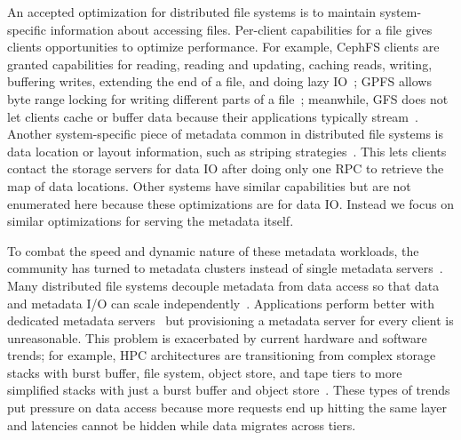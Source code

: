 An accepted optimization for distributed file systems is to maintain
system-specific information about accessing files.  Per-client capabilities for
a file gives clients opportunities to optimize performance.  For example,
CephFS clients are granted capabilities for reading, reading and updating,
caching reads, writing, buffering writes, extending the end of a file, and
doing lazy IO~\cite{docs:cephcaps}; GPFS allows byte range locking for writing
different parts of a file~\cite{schmuck:fast2002-gpfs}; meanwhile, GFS does not
let clients cache or buffer data because their applications typically
stream~\cite{ghemawat:sosp2003-gfs}. Another system-specific piece of metadata
common in distributed file systems is data location or layout information, such
as striping strategies~\cite{nagle_panasas_2004, welch:fast08-panasas,
wang:tech09-lustre, docs:cephstripe, sinnamohideen:atc2010-ursa,
ghemawat:sosp2003-gfs}. This lets clients contact the storage servers for data
IO after doing only one RPC to retrieve the map of data locations.  Other
systems have similar capabilities but are not enumerated here because these
optimizations are for data IO.  Instead we focus on similar optimizations for
serving the metadata itself.

To combat the speed and dynamic nature of these metadata workloads, the
community has turned to metadata clusters instead of single metadata
servers~\cite{patil:fast2011-giga+,weil:osdi2006-ceph,weil:sc2004-dyn-metadata,
sinnamohideen:atc2010-ursa, xing:sc2009-skyfs}.  Many distributed file systems
decouple metadata from data access so that data and metadata I/O can scale
independently~\cite{alam:pdsw2011-metadata-scaling, ghemawat:sosp2003-gfs,
hildebrand:msst2005-pnfs,weil:osdi2006-ceph,welch:fast2008-panasas,xing:sc2009-skyfs}.
Applications perform better with dedicated metadata
servers~\cite{sevilla:sc15-mantle, ren:sc2014-indexfs} but provisioning a
metadata server for every client is unreasonable. This problem is exacerbated
by current hardware and software trends; for example, HPC architectures are
transitioning from complex storage stacks with burst buffer, file system,
object store, and tape tiers to more simplified stacks with just a burst buffer
and object store~\cite{bent:login16-hpc-trends}. These types of trends put
pressure on data access because more requests end up hitting the same layer and
latencies cannot be hidden while data migrates across tiers.

